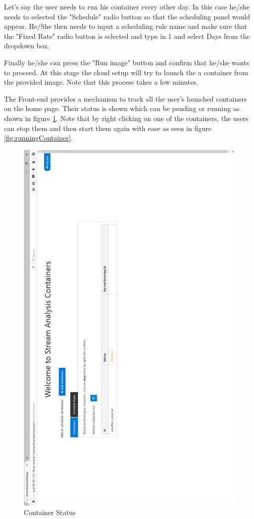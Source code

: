 Let's say the user needs to run his container every other day. In this case he/she needs to selected the "Schedule" radio button so that the scheduling panel would appear. He/She then needs to input a scheduling rule name and make sure that the "Fixed Rate" radio button is selected and type in 1 and select Days from the dropdown box.

Finally he/she can press the "Run image" button and confirm that he/she wants to proceed. At this stage the cloud setup will try to launch the a container from the provided image. Note that this process takes a few minutes.

The Front-end provides a mechanism to track all the user's launched containers on the home page. Their status is shown which can be pending or running as shown in figure \ref{fig:containersExample}. Note that by right clicking on one of the containers, the users can stop them and then start them again with ease as seen in figure \ref{fig:runningContainer}.\\

\begin{figure}[p]
	\centering
	\noindent
	\includegraphics[width=0.5\paperwidth]{./images/guide/container/containersExample.PNG}
	\caption{Container Status}
	\label{fig:containersExample}
\end{figure}

